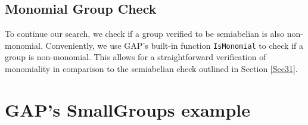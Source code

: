\documentclass[11pt]{article}
\theoremstyle{definition}
\numberwithin{equation}{section}
\begin{document}
\begin{humanblock}
\subsection{Monomial Group Check}
To continue our search, we check if a group verified to be semiabelian is also non-monomial. Conveniently, we use {\ttfamily \large GAP}'s built-in function \texttt{IsMonomial} to check if a group is non-monomial. This allows for a straightforward verification of monomiality in comparison to the semiabelian check outlined in Section \ref{Sec31}. 
\end{humanblock}



\section{{\ttfamily \Large GAP}'s SmallGroups example}
\end{document}
